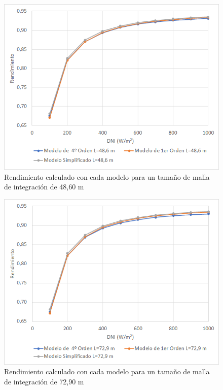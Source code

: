 \begin{figure}[!h]
\includegraphics[width=0.9\linewidth]{images/malla4860.png}
\caption{Rendimiento calculado con cada modelo para un tamaño de malla de integración de 48,60 m} 
\label{fig:malla4860}
\end{figure}

\begin{figure}[!h]
\includegraphics[width=0.9\linewidth]{images/malla7290.png}
\caption{Rendimiento calculado con cada modelo para un tamaño de malla de integración de 72,90 m} 
\label{fig:malla7290}
\end{figure}

